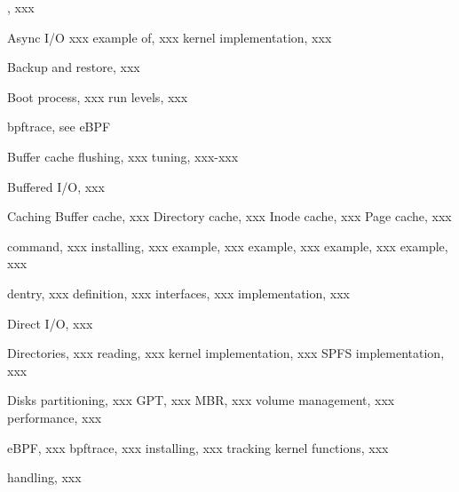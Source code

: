 \begin{theindex}

\indexspace
	\item {}, xxx

\indexspace
 	\item Async I/O xxx
		\subitem example of, xxx
		\subitem kernel implementation, xxx

\indexspace
 	\item Backup and restore, xxx
 
 \indexspace
	 \item Boot process, xxx
	 	\subitem run levels, xxx

\indexspace
	 \item bpftrace, see eBPF

\indexspace
	 \item Buffer cache
		\subitem flushing, xxx
		\subitem tuning, xxx-xxx

\indexspace
	 \item Buffered I/O, xxx

\indexspace
	\item Caching
		\subitem Buffer cache, xxx
		\subitem Directory cache, xxx
		\subitem Inode cache, xxx
		\subitem Page cache, xxx

\indexspace
	\item {} command, xxx
		\subitem installing, xxx
		\subitem example, xxx
		\subitem example, xxx
		\subitem example, xxx
		\subitem example, xxx
 
 \indexspace
	 \item dentry, xxx
		\subitem definition, xxx
		\subitem interfaces, xxx
		\subitem implementation, xxx

\indexspace
	 \item Direct I/O, xxx
 
 \indexspace
	 \item Directories, xxx
	 	\subitem reading, xxx
		\subitem kernel implementation, xxx
		\subitem SPFS implementation, xxx

\indexspace
	 \item Disks
	 	\subitem partitioning, xxx
		\subitem GPT, xxx
		\subitem MBR, xxx
		\subitem volume management, xxx
		\subitem performance, xxx

\indexspace
	 \item eBPF, xxx
	 	\subitem bpftrace, xxx
	 	\subitem installing, xxx
		\subitem tracking kernel functions, xxx

 \indexspace
	 \item {} handling, xxx


\end{theindex}
